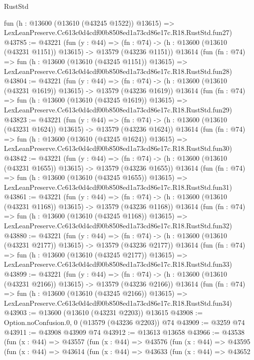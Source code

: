 \begin{lexlean}{RustStd}
\begin{coremodule}
    fun (h : @13600 (@13610 (@43245 @1522)) @13615) =>
    LexLeanPreserve.Cc613c0d4cdf00b8508ed1a73cd86e17c.R18.RustStd.fun27)
@43785 := @43221
    (fun (y : @44) =>
    (fn : @74) -> (h : @13600 (@13610 (@43231 @1151)) @13615) -> @13579 (@43236 @1151))
    @13614
    (fun (fn : @74) =>
    fun (h : @13600 (@13610 (@43245 @1151)) @13615) =>
    LexLeanPreserve.Cc613c0d4cdf00b8508ed1a73cd86e17c.R18.RustStd.fun28)
@43804 := @43221
    (fun (y : @44) =>
    (fn : @74) -> (h : @13600 (@13610 (@43231 @1619)) @13615) -> @13579 (@43236 @1619))
    @13614
    (fun (fn : @74) =>
    fun (h : @13600 (@13610 (@43245 @1619)) @13615) =>
    LexLeanPreserve.Cc613c0d4cdf00b8508ed1a73cd86e17c.R18.RustStd.fun29)
@43823 := @43221
    (fun (y : @44) =>
    (fn : @74) -> (h : @13600 (@13610 (@43231 @1624)) @13615) -> @13579 (@43236 @1624))
    @13614
    (fun (fn : @74) =>
    fun (h : @13600 (@13610 (@43245 @1624)) @13615) =>
    LexLeanPreserve.Cc613c0d4cdf00b8508ed1a73cd86e17c.R18.RustStd.fun30)
@43842 := @43221
    (fun (y : @44) =>
    (fn : @74) -> (h : @13600 (@13610 (@43231 @1655)) @13615) -> @13579 (@43236 @1655))
    @13614
    (fun (fn : @74) =>
    fun (h : @13600 (@13610 (@43245 @1655)) @13615) =>
    LexLeanPreserve.Cc613c0d4cdf00b8508ed1a73cd86e17c.R18.RustStd.fun31)
@43861 := @43221
    (fun (y : @44) =>
    (fn : @74) -> (h : @13600 (@13610 (@43231 @1168)) @13615) -> @13579 (@43236 @1168))
    @13614
    (fun (fn : @74) =>
    fun (h : @13600 (@13610 (@43245 @1168)) @13615) =>
    LexLeanPreserve.Cc613c0d4cdf00b8508ed1a73cd86e17c.R18.RustStd.fun32)
@43880 := @43221
    (fun (y : @44) =>
    (fn : @74) -> (h : @13600 (@13610 (@43231 @2177)) @13615) -> @13579 (@43236 @2177))
    @13614
    (fun (fn : @74) =>
    fun (h : @13600 (@13610 (@43245 @2177)) @13615) =>
    LexLeanPreserve.Cc613c0d4cdf00b8508ed1a73cd86e17c.R18.RustStd.fun33)
@43899 := @43221
    (fun (y : @44) =>
    (fn : @74) -> (h : @13600 (@13610 (@43231 @2166)) @13615) -> @13579 (@43236 @2166))
    @13614
    (fun (fn : @74) =>
    fun (h : @13600 (@13610 (@43245 @2166)) @13615) =>
    LexLeanPreserve.Cc613c0d4cdf00b8508ed1a73cd86e17c.R18.RustStd.fun34)
@43903 := @13600 (@13610 (@43231 @2203)) @13615
@43908 := Option.noConfusion.{0, 0} (@13579 (@43236 @2203)) @74
@43909 := @3259 @74
@43911 := @43908 @43909 @74
@43912 := @13613 @13658
@43966 := @43538
    (fun (x : @44) =>
    @43557
      (fun (x : @44) =>
      @43576
        (fun (x : @44) =>
        @43595
          (fun (x : @44) =>
          @43614
            (fun (x : @44) =>
            @43633
              (fun (x : @44) =>
              @43652

\end{coremodule}
\end{lexlean}
